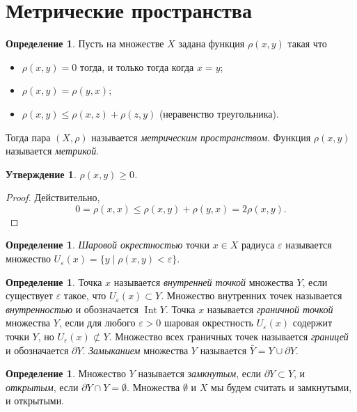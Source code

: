 \documentclass[12pt, titlepage, oneside]{amsbook}
\newcommand{\Int}{\operatorname{Int}}
\newtheorem{claim}[theorem]{Утверждение}
\theoremstyle{definition}
\newtheorem{definition}[theorem]{Определение}
\theoremstyle{remark}
\begin{document}
\section{Метрические пространства}

\begin{definition}
Пусть на множестве $X$ задана функция $\rho(x,y)$ такая что
\begin{itemize}
\item $\rho(x,y)=0$ тогда, и только тогда когда $x=y$;
\item $\rho(x,y)=\rho(y,x)$;
\item $\rho(x,y)\leq \rho(x,z)+\rho(z,y)$ (неравенство треугольника).
\end{itemize}
Тогда пара $(X,\rho)$ называется \emph{метрическим пространством}. Функция $\rho(x,y)$ называется \emph{метрикой}.
\end{definition}

\begin{claim}
\label{Met1}
$\rho(x,y)\geq 0$.
\end{claim}

\begin{proof}
Действительно, $$0=\rho(x,x)\leq \rho(x,y)+\rho(y,x)=2\rho(x,y).$$
\end{proof}

\begin{definition}
\emph{Шаровой окрестностью} точки $x\in X$ радиуса $\varepsilon$ называется множество $U_{\varepsilon}(x)=\{ y\mid \rho(x,y)<\varepsilon\}$.
\end{definition}

\begin{definition}
Точка $x$ называется \emph{внутренней точкой} множества $Y$, если существует $\varepsilon$ такое, что $U_{\varepsilon}(x)\subset Y$. Множество внутренних точек называется \emph{внутренностью} и обозначается $\Int Y$. Точка $x$ называется \emph{граничной точкой} множества $Y$, если для любого $\varepsilon>0$ шаровая окрестность $U_{\varepsilon}(x)$ содержит точки $Y$, но $U_{\varepsilon}(x)\not\subset Y$. Множество всех граничных точек называется \emph{границей} и обозначается $\partial Y$. \emph{Замыканием} множества $Y$ называется $\bar{Y}=Y\cup\partial Y$.
\end{definition}

\begin{definition}
Множество $Y$ называется \emph{замкнутым}, если $\partial Y\subset Y$, и \emph{открытым}, если $\partial Y\cap Y=\emptyset$. Множества $\emptyset$ и $X$ мы будем считать и замкнутыми, и открытыми.
\end{definition}
\end{document}
